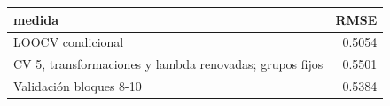 \begin{tabular}{lr}
\toprule
medida & RMSE \\
\midrule
LOOCV condicional & 0.5054 \\
CV 5, transformaciones y lambda renovadas; grupos fijos & 0.5501 \\
Validación bloques 8-10 & 0.5384 \\
\bottomrule
\end{tabular}
